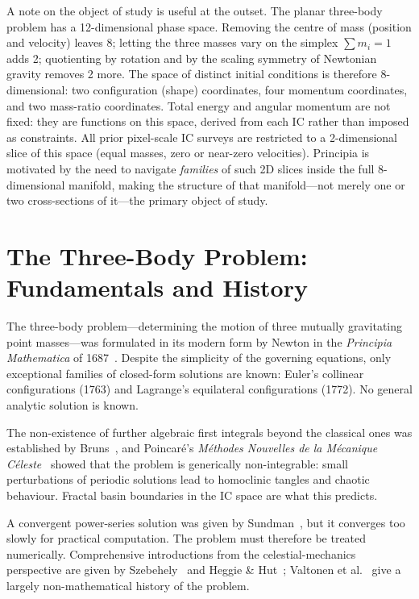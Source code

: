 \documentclass[11pt,a4paper]{article}
\begin{document}
A note on the object of study is useful at the outset.  The planar three-body problem has a
12-dimensional phase space.  Removing the centre of mass (position and velocity) leaves 8;
letting the three masses vary on the simplex $\sum m_i = 1$ adds 2; quotienting by rotation and
by the scaling symmetry of Newtonian gravity removes 2 more.  The space of distinct initial
conditions is therefore 8-dimensional: two configuration (shape) coordinates, four momentum
coordinates, and two mass-ratio coordinates.  Total energy and angular momentum are not fixed:
they are functions on this space, derived from each IC rather than imposed as constraints.  All
prior pixel-scale IC surveys are restricted to a 2-dimensional slice of this space (equal masses,
zero or near-zero velocities).  Principia is motivated by the need to navigate \emph{families} of
such 2D slices inside the full 8-dimensional manifold, making the structure of that
manifold---not merely one or two cross-sections of it---the primary object of study.

\section{The Three-Body Problem: Fundamentals and History}

The three-body problem---determining the motion of three mutually gravitating point masses---was
formulated in its modern form by Newton in the \emph{Principia Mathematica} of
1687~\cite{newton1687}.  Despite the simplicity of the governing equations, only exceptional
families of closed-form solutions are known: Euler's collinear configurations (1763) and
Lagrange's equilateral configurations (1772).  No general analytic solution is known.

The non-existence of further algebraic first integrals beyond the classical ones was established
by Bruns~\cite{bruns1887}, and Poincar\'{e}'s \emph{M\'{e}thodes Nouvelles de la M\'{e}canique
C\'{e}leste}~\cite{poincare1892} showed that the problem is generically non-integrable: small
perturbations of periodic solutions lead to homoclinic tangles and chaotic behaviour.  Fractal
basin boundaries in the IC space are what this predicts.

A convergent power-series solution was given by Sundman~\cite{sundman1912}, but it converges too
slowly for practical computation.  The problem must therefore be treated numerically.
Comprehensive introductions from the celestial-mechanics perspective are given by
Szebehely~\cite{szebehely1967book} and Heggie \& Hut~\cite{heggie2003}; Valtonen et
al.~\cite{valtonen2016} give a largely non-mathematical history of the problem.
\end{document}
